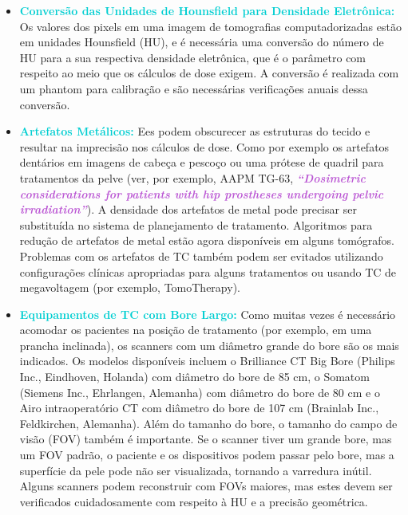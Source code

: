 \documentclass[11pt,a4paper]{article}
\newcounter{exemplo}
\begin{document}
	\begin{itemize}[label=\textcolor{CarnationPink}{$\blacktriangleright$}]
		\item \textcolor{DarkTurquoise}{\textbf{Conversão das Unidades de Hounsfield para Densidade Eletrônica:}} Os valores dos pixels em uma imagem de tomografias computadorizadas estão em unidades Hounsfield (HU), e é necessária uma conversão do número de HU para a sua respectiva densidade eletrônica, que é o parâmetro com respeito ao meio que os cálculos de dose exigem. A conversão é realizada com um phantom para calibração e são necessárias verificações anuais dessa conversão.
		
		\item \textcolor{DarkTurquoise}{\textbf{Artefatos Metálicos:}} Ees podem obscurecer as estruturas do tecido e resultar na imprecisão nos cálculos de dose. Como por exemplo os artefatos dentários em imagens de cabeça e pescoço ou uma prótese de quadril para tratamentos da pelve (ver, por exemplo, AAPM TG-63, \textcolor{MediumOrchid}{\textit{\textbf{``Dosimetric considerations for patients with hip prostheses undergoing pelvic irradiation''}}}). A densidade dos artefatos de metal pode precisar ser substituída no sistema de planejamento de tratamento. Algoritmos para redução de artefatos de metal estão agora disponíveis em alguns tomógrafos. Problemas com os artefatos de TC também podem ser evitados utilizando configurações clínicas apropriadas para alguns tratamentos ou usando TC de megavoltagem (por exemplo, TomoTherapy).
		
		\item \textcolor{DarkTurquoise}{\textbf{Equipamentos de TC com Bore Largo:}} Como muitas vezes é necessário acomodar os pacientes na posição de tratamento (por exemplo, em uma prancha inclinada), os scanners com um diâmetro grande do bore são os mais indicados. Os modelos disponíveis incluem o Brilliance CT Big Bore (Philips Inc., Eindhoven, Holanda) com diâmetro do bore de 85 cm, o Somatom (Siemens Inc., Ehrlangen, Alemanha) com diâmetro do bore de 80 cm e o Airo intraoperatório CT com diâmetro do bore de 107 cm (Brainlab Inc., Feldkirchen, Alemanha). Além do tamanho do bore, o tamanho do campo de visão (FOV) também é importante. Se o scanner tiver um grande bore, mas um FOV padrão, o paciente e os dispositivos podem passar pelo bore, mas a superfície da pele pode não ser visualizada, tornando a varredura inútil. Alguns scanners podem reconstruir com FOVs maiores, mas estes devem ser verificados cuidadosamente com respeito à HU e a precisão geométrica.
	\end{itemize}
\end{document}
